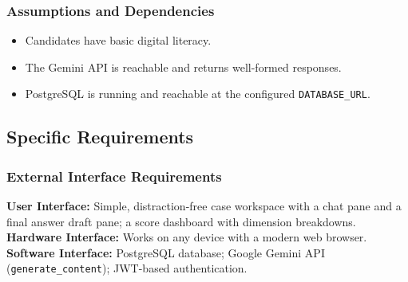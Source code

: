 \documentclass[12pt,a4paper]{report}
\begin{document}
\subsubsection{Assumptions and Dependencies}
\begin{itemize}[nosep]
    \item Candidates have basic digital literacy.
    \item The Gemini API is reachable and returns well-formed responses.
    \item PostgreSQL is running and reachable at the configured \texttt{DATABASE\_URL}.
\end{itemize}

\subsection{Specific Requirements}

\subsubsection{External Interface Requirements}
\textbf{User Interface:} Simple, distraction-free case workspace with a chat pane and a final
answer draft pane; a score dashboard with dimension breakdowns.\\
\textbf{Hardware Interface:} Works on any device with a modern web browser.\\
\textbf{Software Interface:} PostgreSQL database; Google Gemini API (\texttt{generate\_content});
JWT-based authentication.
\end{document}
